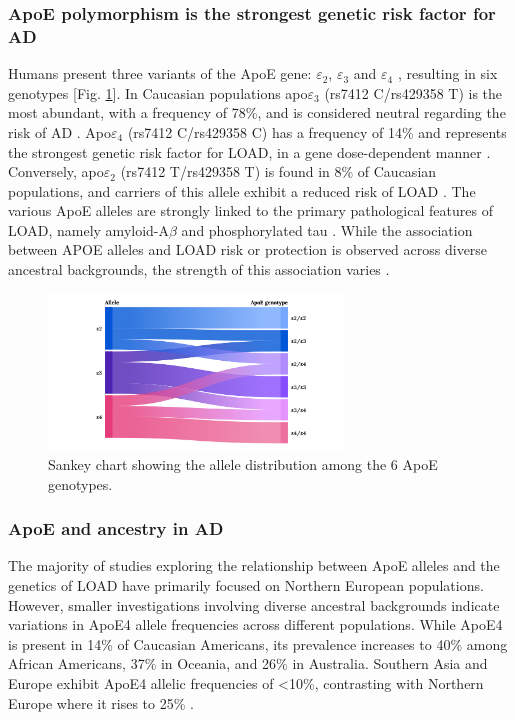 \documentclass{amsart}
\theoremstyle{plain}
\begin{document}
\subsubsection{ApoE polymorphism is the strongest genetic risk factor for AD}
Humans present three variants of the ApoE gene: $\varepsilon_2$, $\varepsilon_3$ and $\varepsilon_4$ \cite{Husain2021APOETherapeutics, Yang2023ApolipoproteinDisease}, resulting in six genotypes [Fig. \ref{fig1}]. In Caucasian populations apo$\varepsilon_3$ (rs7412 C/rs429358 T) is the most abundant, with a frequency of 78\%, and is considered neutral regarding the risk of AD \cite{Liu2013ApolipoproteinTherapy}. Apo$\varepsilon_4$ (rs7412 C/rs429358 C) has a frequency of 14\% and represents the strongest genetic risk factor for LOAD, in a gene dose-dependent manner \cite{Strittmatter1993ApolipoproteinDisease}. Conversely, apo$\varepsilon_2$ (rs7412 T/rs429358 T) is found in 8\% of Caucasian populations, and carriers of this allele exhibit a reduced risk of LOAD \cite{Liu2013ApolipoproteinTherapy}. The various ApoE alleles are strongly linked to the primary pathological features of LOAD, namely amyloid-A$\beta$ and phosphorylated tau \cite{Deming2017Genome-wideModifiers}. While the association between APOE alleles and LOAD risk or protection is observed across diverse ancestral backgrounds, the strength of this association varies \cite{Belloy2019AForward, Farrer1997EffectsMeta-analysis}.

\begin{figure}[]
  \includegraphics[width=0.7\textwidth]{figures/ApoE@2x.png}
    \caption{Sankey chart showing the allele distribution among the 6 ApoE genotypes.}
  \label{fig1}
\end{figure}

\subsubsection{ApoE and ancestry in AD}
The majority of studies exploring the relationship between ApoE alleles and the genetics of LOAD have primarily focused on Northern European populations\cite{Yang2023ApolipoproteinDisease}. However, smaller investigations involving diverse ancestral backgrounds indicate variations in ApoE4 allele frequencies across different populations\cite{Yang2023ApolipoproteinDisease}. While ApoE4 is present in 14\% of Caucasian Americans, its prevalence increases to 40\% among African Americans, 37\% in Oceania, and 26\% in Australia. Southern Asia and Europe exhibit ApoE4 allelic frequencies of <10\%, contrasting with Northern Europe where it rises to 25\% \cite{Belloy2019AForward, Egert2012ApoEFactors, Eisenberg2010WorldwideHistory, Logue2011AAmericans}.
\end{document}
